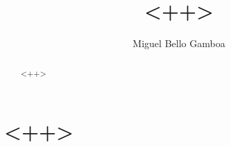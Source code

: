 \documentclass[a4paper,11pt]{scrartcl}
\begin{document}
\title{<++>}

\author{Miguel Bello Gamboa}

\maketitle

\begin{abstract}
<++>
\end{abstract}


\section{<++>}

\printbibliography[heading=bibintoc,title={Bibliography}]
\end{document}
